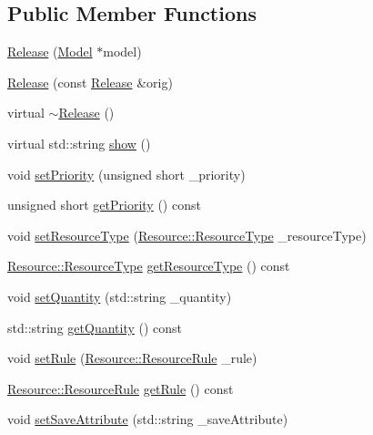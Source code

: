\subsection*{Public Member Functions}
\begin{DoxyCompactItemize}
\item 
\hyperlink{class_release_a4abb6616f9b6de8183558f0c380ccea3}{Release} (\hyperlink{class_model}{Model} $\ast$model)
\item 
\hyperlink{class_release_a25a9193717393a31a696cfcaf87f8a8b}{Release} (const \hyperlink{class_release}{Release} \&orig)
\item 
virtual \hyperlink{class_release_ab1a1b4ee65816a9e64076851013197cd}{$\sim$\-Release} ()
\item 
virtual std\-::string \hyperlink{class_release_a1ec7b35553820f0f228f31be1df468c3}{show} ()
\item 
void \hyperlink{class_release_a2ae04a23e51878dd38ef863e81b68e3c}{set\-Priority} (unsigned short \-\_\-priority)
\item 
unsigned short \hyperlink{class_release_acada98c95b08a9070630cde5bd922aaf}{get\-Priority} () const 
\item 
void \hyperlink{class_release_a07cc476fd514c72640bdef6e8cb2b512}{set\-Resource\-Type} (\hyperlink{class_resource_ae2554291a9f2c6b3fedb01d0ca41bfd8}{Resource\-::\-Resource\-Type} \-\_\-resource\-Type)
\item 
\hyperlink{class_resource_ae2554291a9f2c6b3fedb01d0ca41bfd8}{Resource\-::\-Resource\-Type} \hyperlink{class_release_a8dd7c5b8c0135c223bef50c9e463d980}{get\-Resource\-Type} () const 
\item 
void \hyperlink{class_release_a79c838d313189712919ca132d3e4102a}{set\-Quantity} (std\-::string \-\_\-quantity)
\item 
std\-::string \hyperlink{class_release_ab71d29f1a502f6b0a1d65d34ff999efc}{get\-Quantity} () const 
\item 
void \hyperlink{class_release_a13fb0d59da84d24db8718e8ffc339594}{set\-Rule} (\hyperlink{class_resource_a8e67503c93766e1ecb47c6a9d744f86d}{Resource\-::\-Resource\-Rule} \-\_\-rule)
\item 
\hyperlink{class_resource_a8e67503c93766e1ecb47c6a9d744f86d}{Resource\-::\-Resource\-Rule} \hyperlink{class_release_ad2a09b00d0be4bf0234ad054675b6fe1}{get\-Rule} () const 
\item 
void \hyperlink{class_release_a6f9e951b23189c70d3b323be8a76a102}{set\-Save\-Attribute} (std\-::string \-\_\-save\-Attribute)
\item 

\end{DoxyCompactItemize}
